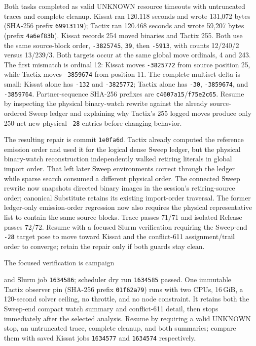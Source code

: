 \documentclass[11pt]{article}
\newcommand{\code}[1]{\texttt{#1}}
\newcommand{\artifact}[1]{\path{#1}}
\begin{document}
Both tasks completed as valid UNKNOWN resource timeouts with untruncated traces
and complete cleanup. Kissat ran 120.118 seconds and wrote 131,072 bytes
(SHA-256 prefix \code{69913119}); Tactix ran 120.468 seconds and wrote 59,207
bytes (prefix \code{4a6ef83b}). Kissat records 254 moved binaries and Tactix
255. Both use the same source-block order, \code{-3825745}, \code{39}, then
\code{-5913}, with counts 12/240/2 versus 13/239/3. Both targets occur at the
same global move ordinals, 4 and 243. The first mismatch is ordinal 12:
Kissat moves \code{-3825772} from source position 25, while Tactix moves
\code{-3859674} from position 11. The complete multiset delta is small:
Kissat alone has \code{-132} and \code{-3825772}; Tactix alone has
\code{-30}, \code{-3859674}, and \code{-3859764}. Partner-sequence SHA-256
prefixes are \code{c4607a15}/\code{f75e2c65}. Resume by inspecting the
physical binary-watch rewrite against the already source-ordered Sweep ledger
and explaining why Tactix's 255 logged moves produce only 250 net new physical
\code{-28} entries before changing behavior.

The resulting repair is commit \code{1e0fa6d}. Tactix already computed the
reference emission order and used it for the logical dense Sweep ledger, but
the physical binary-watch reconstruction independently walked retiring
literals in global import order. That left later Sweep environments correct
through the ledger while sparse search consumed a different physical order.
The connected Sweep rewrite now snapshots directed binary images in the
session's retiring-source order; canonical Substitute retains its existing
import-order traversal. The former ledger-only emission-order regression now
also requires the physical representative list to contain the same source
blocks. Trace passes 71/71 and isolated Release passes 72/72. Resume with a
focused Slurm verification requiring the Sweep-end \code{-28} target pose to
move toward Kissat and the conflict-611 assignment/trail order to converge;
retain the repair only if both guards stay clean.

The focused verification is campaign
\begin{center}\small\artifact{20260819-1026-tierd-rank22-emission-order-verify}\end{center}
and Slurm job \code{1634586}; scheduler dry run \code{1634585} passed. One
immutable Tactix observer pin (SHA-256 prefix \code{01f62a79}) runs with two
CPUs, 16\,GiB, a 120-second solver ceiling, no throttle, and no node constraint.
It retains both the Sweep-end compact watch summary and conflict-611 detail,
then stops immediately after the selected analysis. Resume by requiring a valid
UNKNOWN stop, an untruncated trace, complete cleanup, and both summaries; compare
them with saved Kissat jobs \code{1634577} and \code{1634574} respectively.
\end{document}
